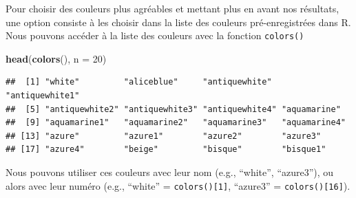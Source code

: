 \documentclass[]{book}
\newenvironment{Shaded}{\begin{snugshade}}{\end{snugshade}}
\newcommand{\DataTypeTok}[1]{\textcolor[rgb]{0.13,0.29,0.53}{#1}}
\newcommand{\DecValTok}[1]{\textcolor[rgb]{0.00,0.00,0.81}{#1}}
\newcommand{\KeywordTok}[1]{\textcolor[rgb]{0.13,0.29,0.53}{\textbf{#1}}}
\newcommand{\NormalTok}[1]{#1}
\begin{document}
Pour choisir des couleurs plus agréables et mettant plus en avant nos résultats, une option consiste à les choisir dans la liste des couleurs pré-enregistrées dans R. Nous pouvons accéder à la liste des couleurs avec la fonction \texttt{colors()}

\begin{Shaded}
\begin{Highlighting}[]
\KeywordTok{head}\NormalTok{(}\KeywordTok{colors}\NormalTok{(), }\DataTypeTok{n =} \DecValTok{20}\NormalTok{)}
\end{Highlighting}
\end{Shaded}

\begin{verbatim}
##  [1] "white"         "aliceblue"     "antiquewhite"  "antiquewhite1"
##  [5] "antiquewhite2" "antiquewhite3" "antiquewhite4" "aquamarine"   
##  [9] "aquamarine1"   "aquamarine2"   "aquamarine3"   "aquamarine4"  
## [13] "azure"         "azure1"        "azure2"        "azure3"       
## [17] "azure4"        "beige"         "bisque"        "bisque1"
\end{verbatim}

Nous pouvons utiliser ces couleurs avec leur nom (e.g., ``white'', ``azure3''), ou alors avec leur numéro (e.g., ``white'' = \texttt{colors(){[}1{]}}, ``azure3'' = \texttt{colors(){[}16{]}}).
\end{document}
